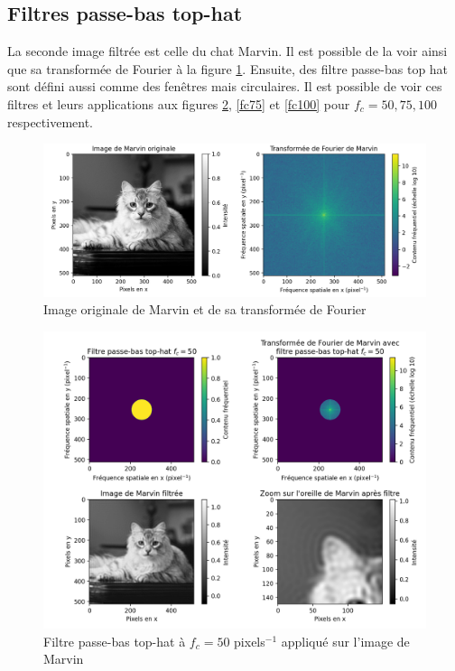 \documentclass[11pt,letterpaper]{article}
\begin{document}
\subsection{Filtres passe-bas top-hat}

La seconde image filtrée est celle du chat Marvin. Il est possible de la voir ainsi que sa transformée de Fourier à la figure \ref{cat_og}. Ensuite, des filtre passe-bas top hat sont défini aussi comme des fenêtres mais circulaires. Il est possible de voir ces filtres et leurs applications aux figures \ref{fc50hat}, \ref{fc75} et \ref{fc100} pour $f_c = 50, 75,100$ respectivement.

\begin{figure}[H]
  \centering
  \includegraphics[scale=0.68]{marvin_og.png}
  \caption{Image originale de Marvin et de sa transformée de Fourier}
  \label{cat_og}
\end{figure}

\begin{figure}[H]
  \centering
  \includegraphics[scale=0.7]{marvin_post_filter_fc_50.png}
  \caption{Filtre passe-bas top-hat à $f_c = 50$ pixels$^{-1}$ appliqué sur l'image de Marvin}
  \label{fc50hat}
\end{figure}
\end{document}
